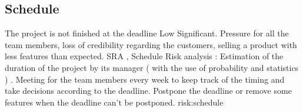 \subsection{Schedule}


{The project is not finished at the deadline}
{Low}
{Significant. Pressure for all the team members, loss of credibility regarding the customers, selling a product with less features than expected.}
{ SRA , Schedule Risk analysis : Estimation of the duration of the project by its manager ( with the use of probability and statistics ) . Meeting for the team members every week to keep track of the timing and take decisions according to the deadline. }
{ Postpone the deadline or remove some features when the deadline can't be postponed. }
{risk:schedule}